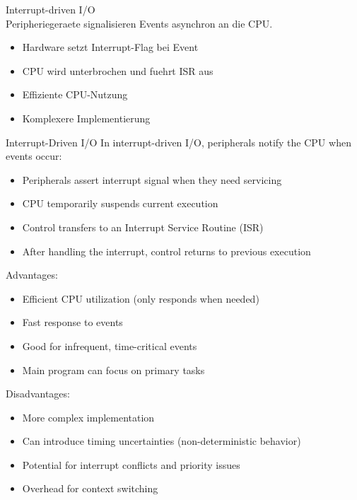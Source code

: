 \begin{definition}{Interrupt-driven I/O}\\
    Peripheriegeraete signalisieren Events asynchron an die CPU.
    \begin{itemize}
        \item Hardware setzt Interrupt-Flag bei Event
        \item CPU wird unterbrochen und fuehrt ISR aus
        \item Effiziente CPU-Nutzung
        \item Komplexere Implementierung
    \end{itemize}
\end{definition}

\begin{concept}{Interrupt-Driven I/O}
In interrupt-driven I/O, peripherals notify the CPU when events occur:
\begin{itemize}
    \item Peripherals assert interrupt signal when they need servicing
    \item CPU temporarily suspends current execution
    \item Control transfers to an Interrupt Service Routine (ISR)
    \item After handling the interrupt, control returns to previous execution
\end{itemize}

Advantages:
\begin{itemize}
    \item Efficient CPU utilization (only responds when needed)
    \item Fast response to events
    \item Good for infrequent, time-critical events
    \item Main program can focus on primary tasks
\end{itemize}

Disadvantages:
\begin{itemize}
    \item More complex implementation
    \item Can introduce timing uncertainties (non-deterministic behavior)
    \item Potential for interrupt conflicts and priority issues
    \item Overhead for context switching
\end{itemize}
\end{concept}

